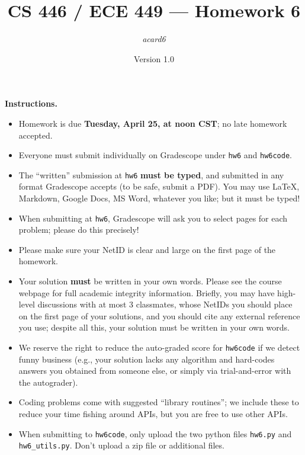 \documentclass{article}
\title{CS 446 / ECE 449 --- Homework 6}
\author{\emph{acard6}}
\date{Version 1.0}
\theoremstyle{definition}
\theoremstyle{remark}
\begin{document}
\maketitle

\noindent\textbf{Instructions.}
\begin{itemize}
  \item
    Homework is due \textbf{Tuesday, April 25, at noon CST}; no late homework accepted.

  \item
    Everyone must submit individually on Gradescope under \texttt{hw6} and \texttt{hw6code}.

  \item
    The ``written'' submission at \texttt{hw6} \textbf{must be typed}, and submitted in
    any format Gradescope accepts (to be safe, submit a PDF).  You may use \LaTeX, Markdown,
    Google Docs, MS Word, whatever you like; but it must be typed!

  \item
    When submitting at \texttt{hw6}, Gradescope will ask you to select pages
    for each problem; please do this precisely!

  \item
    Please make sure your NetID is clear and large on the first page of the homework.

  \item
    Your solution \textbf{must} be written in your own words.
    Please see the course webpage for full academic integrity information.
    Briefly, you may have high-level discussions with at most 3 classmates,
    whose NetIDs you should place on the first page of your solutions,
    and you should cite any external reference you use; despite all this,
    your solution must be written in your own words.

    \item
      We reserve the right to reduce the auto-graded score for
      \texttt{hw6code} if we detect funny business (e.g., your solution
      lacks any algorithm and hard-codes answers you obtained from
      someone else, or simply via trial-and-error with the autograder).

    \item
      Coding problems come with suggested ``library routines''; we include these to reduce
      your time fishing around APIs, but you are free to use other APIs.

    \item
      When submitting to \texttt{hw6code}, only upload the two python files \texttt{hw6.py} and \texttt{hw6\_utils.py}. Don't upload a zip file or additional files.
    
\end{itemize}
\end{document}
